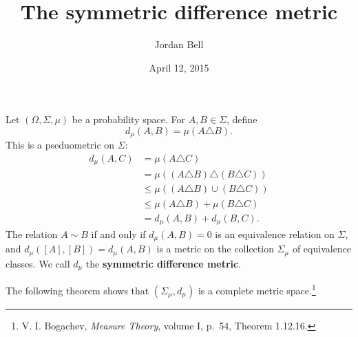 \documentclass{article}
\theoremstyle{definition}
\begin{document}
\title{The symmetric difference metric}
\author{Jordan Bell}
\date{April 12, 2015}

\maketitle

Let $(\Omega,\Sigma,\mu)$ be a probability space. 
For $A,B \in \Sigma$, define 
\[
d_\mu(A,B) = \mu(A \triangle B).
\]
This is a pseduometric on $\Sigma$: 
\begin{align*}
d_\mu(A,C)&=\mu( A \triangle C)\\
&=\mu((A \triangle B) \triangle (B \triangle C))\\
&\leq \mu((A \triangle B) \cup (B \triangle C))\\
&\leq \mu(A \triangle B) + \mu(B \triangle C)\\
&=d_\mu(A,B)+d_\mu(B,C).
\end{align*}
The relation $A \sim B$ if and only if
$d_\mu(A,B)=0$ is an equivalence relation on $\Sigma$, and
$d_\mu([A],[B])=d_\mu(A,B)$ is a metric on the collection $\Sigma_\mu$ of equivalence classes.
We call $d_\mu$ the \textbf{symmetric difference metric}.

The following theorem shows that
$(\Sigma_\mu,d_\mu)$ is a complete metric space.\footnote{V. I. Bogachev, {\em Measure Theory}, volume I,
p.~54, Theorem 1.12.16.}
\end{document}
